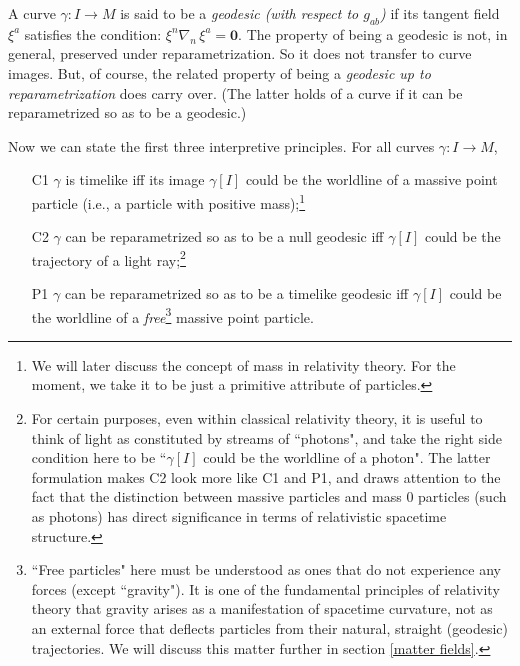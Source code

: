 \documentclass [12] {article}
\theoremstyle{plain}
\numberwithin{figure}{subsection}
\numberwithin{proposition}{subsection}
\begin{document}
A curve $\gamma \! \! : I \rightarrow M$  is said to be a \emph{geodesic (with respect to $g_{ab}$)} if its tangent field $\xi^a$ satisfies the condition:   $\xi^n  \nabla_{\! n} \, \xi^a = \textbf{0}$. 
The property of being a geodesic  is not, in general, preserved under reparametrization. So it does not transfer to curve images.  But, of course, the related property of being a \emph{geodesic up to reparametrization} does carry over.  (The latter holds of a curve if it can be reparametrized so as to be a geodesic.) 

Now we can state the first three interpretive principles. For all curves  $\gamma \!  : I \rightarrow M$, 
\begin{enumerate}
\item [C1]  $\gamma$ is timelike iff its image  $\gamma [I]$ could be  the worldline of a massive point particle (i.e., a particle with positive mass);\footnote{We will later discuss the concept of mass in relativity theory. For the moment, we take it to be just a primitive attribute of particles.}
\item[C2] $\gamma$ can be reparametrized so as to be a null geodesic iff $\gamma [I]$ could be the trajectory of a light ray;\footnote{For certain purposes, even within classical relativity theory, it is useful to think of light as constituted by streams of  ``photons", and take the right side condition here to be ``$\gamma [I]$ could be the worldline of a photon". The latter formulation makes C2 look more like C1 and P1, and draws attention to the fact that the distinction between massive particles and mass $0$ particles (such as photons) has direct significance in terms of relativistic spacetime structure. %
}


\item[P1] $\gamma$ can be reparametrized so as to be a timelike geodesic iff  $\gamma [I]$ could be  the worldline of a \emph{free}\footnote{``Free  particles" here must be understood as ones that do not experience any forces (except ``gravity").  It is one of the fundamental principles of relativity theory that gravity arises as a manifestation of  spacetime curvature, not as an external force that deflects particles from their natural, straight (geodesic) trajectories. We will discuss this matter further in section \ref{matter fields}.}  massive point particle.
\end{enumerate}  
\end{document}

